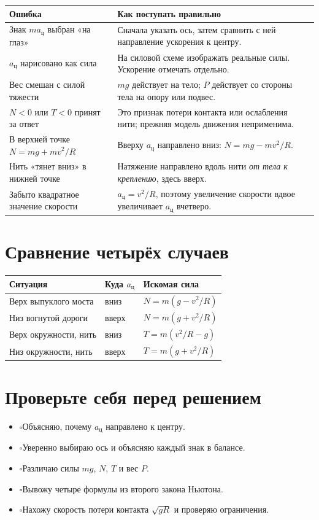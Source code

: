 \documentclass[a4paper,11pt]{article}
\newcommand{\checkitem}{\ensuremath{\square}\hspace{0.35em}}
\newcommand{\acent}{a_{\text{ц}}}
\newcommand{\mysection}[1]{\section{#1}\vspace{-0.2em}}
\begin{document}
\begin{tabularx}{\linewidth}{@{}p{.31\linewidth}X@{}}
\toprule
\textbf{Ошибка} & \textbf{Как поступать правильно} \\
\midrule
Знак $m\acent$ выбран «на глаз» & Сначала указать ось, затем сравнить с ней направление ускорения к центру. \\
$\acent$ нарисовано как сила & На силовой схеме изображать реальные силы. Ускорение отмечать отдельно. \\
Вес смешан с силой тяжести & $mg$ действует на тело; $P$ действует со стороны тела на опору или подвес. \\
$N<0$ или $T<0$ принят за ответ & Это признак потери контакта или ослабления нити; прежняя модель движения неприменима. \\
В верхней точке $N=mg+mv^2/R$ & Вверху $\acent$ направлено вниз: $N=mg-mv^2/R$. \\
Нить «тянет вниз» в нижней точке & Натяжение направлено вдоль нити \emph{от тела к креплению}, здесь вверх. \\
Забыто квадратное значение скорости & $\acent=v^2/R$, поэтому увеличение скорости вдвое увеличивает $\acent$ вчетверо. \\
\bottomrule
\end{tabularx}
\vspace{.7em}
\mysection{Сравнение четырёх случаев}
\renewcommand{\arraystretch}{1.22}
\begin{tabularx}{\linewidth}{@{}p{.34\linewidth}p{.22\linewidth}X@{}}
\toprule
\textbf{Ситуация} & \textbf{Куда $\acent$} & \textbf{Искомая сила} \\
\midrule
Верх выпуклого моста & вниз & $N=m(g-v^2/R)$ \\
Низ вогнутой дороги & вверх & $N=m(g+v^2/R)$ \\
Верх окружности, нить & вниз & $T=m(v^2/R-g)$ \\
Низ окружности, нить & вверх & $T=m(g+v^2/R)$ \\
\bottomrule
\end{tabularx}
\vspace{.8em}
\mysection{Проверьте себя перед решением}
\begin{itemize}[label={},leftmargin=0pt]
\item \checkitem Объясняю, почему $\acent$ направлено к центру.
\item \checkitem Уверенно выбираю ось и объясняю каждый знак в балансе.
\item \checkitem Различаю силы $mg$, $N$, $T$ и вес $P$.
\item \checkitem Вывожу четыре формулы из второго закона Ньютона.
\item \checkitem Нахожу скорость потери контакта $\sqrt{gR}$ и проверяю ограничения.
\end{itemize}
\clearpage
\end{document}
